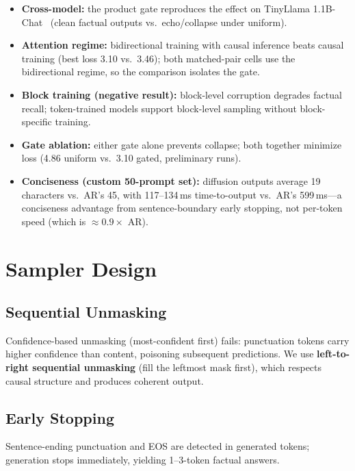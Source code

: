 \documentclass{article}
\begin{document}
\begin{itemize}
    \item \textbf{Cross-model:} the product gate reproduces the effect on TinyLlama
    1.1B-Chat~\cite{zhang2024tinyllama} (clean factual outputs vs.\ echo/collapse
    under uniform).
    \item \textbf{Attention regime:} bidirectional training with causal inference
    beats causal training (best loss 3.10 vs.\ 3.46); both matched-pair cells use the
    bidirectional regime, so the comparison isolates the gate.
    \item \textbf{Block training (negative result):} block-level corruption degrades
    factual recall; token-trained models support block-level sampling without
    block-specific training.
    \item \textbf{Gate ablation:} either gate alone prevents collapse; both together
    minimize loss (4.86 uniform vs.\ 3.10 gated, preliminary runs).
    \item \textbf{Conciseness (custom 50-prompt set):} diffusion outputs average 19
    characters vs.\ AR's 45, with 117--134\,ms time-to-output vs.\ AR's 599\,ms---a
    conciseness advantage from sentence-boundary early stopping, not per-token speed
    (which is $\approx 0.9\times$ AR).
\end{itemize}


\section{Sampler Design}

\subsection{Sequential Unmasking}

Confidence-based unmasking (most-confident first) fails: punctuation tokens carry
higher confidence than content, poisoning subsequent predictions. We use
\textbf{left-to-right sequential unmasking} (fill the leftmost mask first), which
respects causal structure and produces coherent output.

\subsection{Early Stopping}

Sentence-ending punctuation and EOS are detected in generated tokens; generation stops
immediately, yielding 1--3-token factual answers.
\end{document}
